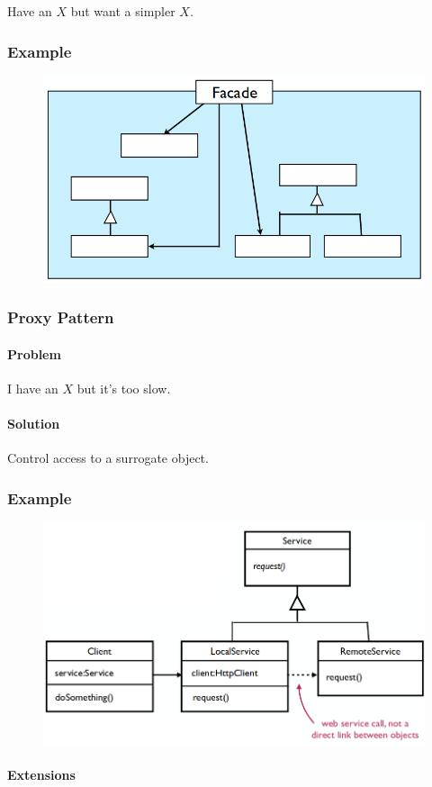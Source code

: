 \documentclass[twocolumn,english]{article}
\begin{document}
Have an $X$ but want a simpler $X$.

\subsubsection*{Example}

\begin{figure}[H]
\centering{}\includegraphics[width=0.4\columnwidth]{img/facade}
\end{figure}

\subsubsection{Proxy Pattern}

\paragraph{Problem}

I have an $X$ but it's too slow.

\paragraph{Solution}

Control access to a surrogate object.

\subsubsection*{Example}

\begin{figure}[H]
\centering{}\includegraphics[width=0.6\columnwidth]{img/proxy}
\end{figure}

\paragraph{Extensions}
\end{document}
